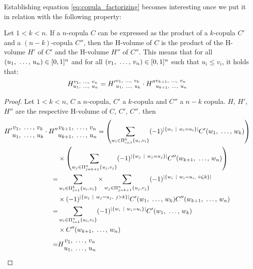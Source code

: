 Establishing equation \eqref{eq:copula_factorizing} becomes interesting once we put it in relation with the following property:
\begin{proposition}\label{prop:hvol_factorizing}
    Let $1<k<n$. If a $n$-copula $C$ can be expressed as the product of a $k$-copula $C'$ and a $(n-k)$-copula $C''$, then the H-volume of $C$ is the product of the H-volume $H'$ of $C'$ and the H-volume $H''$ of $C''$. This means that for all $(u_1 {, ~\dots, ~} u_n)\in[0,1]^n$ and for all $(v_1 {, ~\dots, ~} v_n)\in[0,1]^n$ such that $u_i\leqslant v_i$, it holds that:
    \begin{align}
        H_{u_1 {, ~\dots, ~} u_n}^{v_1 {, ~\dots, ~} v_n} = {H'}_{u_1 {, ~\dots, ~} u_k}^{v_1 {, ~\dots, ~} v_k}\cdot{H''}_{u_{k+1} {, ~\dots, ~} u_n}^{v_{k+1} {, ~\dots, ~} v_n}
    \end{align}
\end{proposition}
\begin{proof}
    Let $1<k<n$, $C$ a $n$-copula, $C'$ a $k$-copula and $C''$ a $n-k$ copula. $H$, $H'$, $H''$ are the respective H-volume of $C$, $C'$, $C''$. then
    \begin{align*}
        {H'}
        \begin{matrix}
            v_1 {, ~\dots, ~}  v_k\\
            u_1 {, ~\dots, ~}  u_k
        \end{matrix}
        \cdot {H''}&
        \begin{matrix}
            v_{k+1} {, ~\dots, ~}  v_n\\
            u_{k+1} {, ~\dots, ~}  u_n
        \end{matrix}= \left(\sum_{w_i\in\Pi_{i=1}^{k}\{u_i,v_i\}}(-1)^{|\{w_i~|~w_i=u_i\}|}C'(w_1 {, ~\dots, ~} w_k)\right)\\
        &\times\left(\sum_{w_j\in\Pi_{j=k+1}^{n}\{u_j,v_j\}}(-1)^{|\{w_j~|~w_j=u_j\}|}C''(w_{k+1} {, ~\dots, ~} w_n)\right)\\
        =& \sum_{w_i\in\Pi_{i=1}^{k}\{u_i,v_i\}}\times\sum_{w_j\in\Pi_{j=k+1}^{n}\{u_j,v_j\}}(-1)^{|\{w_i~|~w_i=u_i,~i\leqslant k\}|}\\
        &\times(-1)^{|\{w_j~|~w_j=u_j,~ j>k\}|}C'(w_1 {, ~\dots, ~} w_k)C''(w_{k+1} {, ~\dots, ~} w_n)\\
        =&\sum_{w_i\in\Pi_{i=1}^{n}\{u_i,v_i\}}(-1)^{|\{w_i~|~w_i=u_i\}|}C'(w_1 {, ~\dots, ~} w_k)\\
        &\times C''(w_{k+1} {, ~\dots, ~} w_n)\\
        =&H
        \begin{matrix}
            v_1 {, ~\dots, ~}  v_n\\
            u_1 {, ~\dots, ~}  u_n
        \end{matrix}
    \end{align*}
\end{proof}
